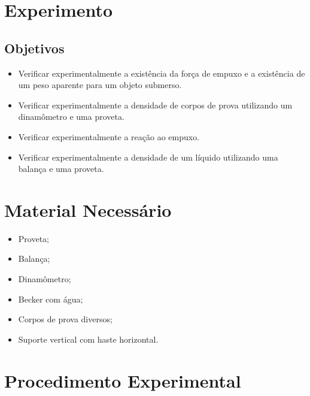 \section{Experimento}

\subsection{Objetivos}
\label{Sec:ObjetivosEmpuxo}

\begin{itemize}
	\item Verificar experimentalmente a existência da força de empuxo e a existência de um peso aparente para um objeto submerso.
	\item Verificar experimentalmente a densidade de corpos de prova utilizando um dinamômetro e uma proveta.
	\item Verificar experimentalmente a reação ao empuxo.
	\item Verificar experimentalmente a densidade de um líquido utilizando uma balança e uma proveta.
\end{itemize}

\section{Material Necessário}

\begin{itemize}
	\item Proveta;
	\item Balança;
	\item Dinamômetro;
	\item Becker com água;
	\item Corpos de prova diversos;
	\item Suporte vertical com haste horizontal.
\end{itemize}

\section{Procedimento Experimental}

